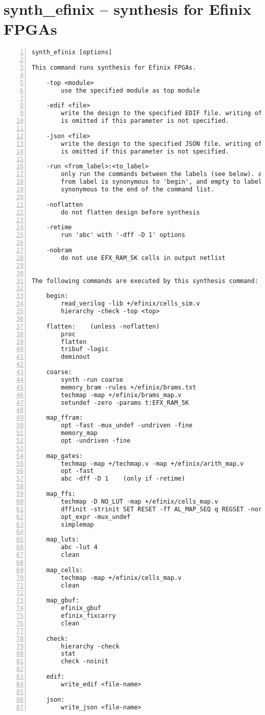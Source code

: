 \section{synth\_efinix -- synthesis for Efinix FPGAs}
\label{cmd:synth_efinix}
\begin{lstlisting}[numbers=left,frame=single]
    synth_efinix [options]

This command runs synthesis for Efinix FPGAs.

    -top <module>
        use the specified module as top module

    -edif <file>
        write the design to the specified EDIF file. writing of an output file
        is omitted if this parameter is not specified.

    -json <file>
        write the design to the specified JSON file. writing of an output file
        is omitted if this parameter is not specified.

    -run <from_label>:<to_label>
        only run the commands between the labels (see below). an empty
        from label is synonymous to 'begin', and empty to label is
        synonymous to the end of the command list.

    -noflatten
        do not flatten design before synthesis

    -retime
        run 'abc' with '-dff -D 1' options

    -nobram
        do not use EFX_RAM_5K cells in output netlist


The following commands are executed by this synthesis command:

    begin:
        read_verilog -lib +/efinix/cells_sim.v
        hierarchy -check -top <top>

    flatten:    (unless -noflatten)
        proc
        flatten
        tribuf -logic
        deminout

    coarse:
        synth -run coarse
        memory_bram -rules +/efinix/brams.txt
        techmap -map +/efinix/brams_map.v
        setundef -zero -params t:EFX_RAM_5K

    map_ffram:
        opt -fast -mux_undef -undriven -fine
        memory_map
        opt -undriven -fine

    map_gates:
        techmap -map +/techmap.v -map +/efinix/arith_map.v
        opt -fast
        abc -dff -D 1    (only if -retime)

    map_ffs:
        techmap -D NO_LUT -map +/efinix/cells_map.v
        dffinit -strinit SET RESET -ff AL_MAP_SEQ q REGSET -noreinit
        opt_expr -mux_undef
        simplemap

    map_luts:
        abc -lut 4
        clean

    map_cells:
        techmap -map +/efinix/cells_map.v
        clean

    map_gbuf:
        efinix_gbuf
        efinix_fixcarry
        clean

    check:
        hierarchy -check
        stat
        check -noinit

    edif:
        write_edif <file-name>

    json:
        write_json <file-name>
\end{lstlisting}

